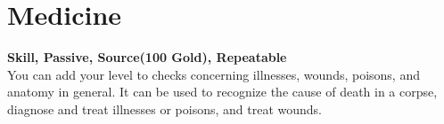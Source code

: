 \section{Medicine}\label{sec:medicine}
\textbf{Skill, Passive, Source(100 Gold), Repeatable}\\
You can add your level to checks concerning illnesses, wounds, poisons, and anatomy in general.
It can be used to recognize the cause of death in a corpse, diagnose and treat illnesses or poisons, and treat wounds.